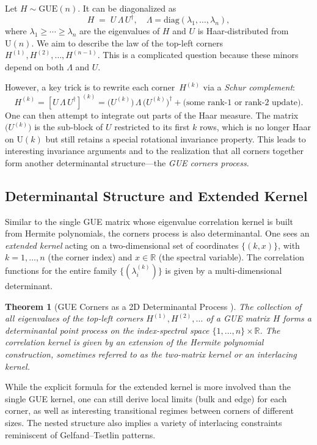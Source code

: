 \documentclass[letterpaper,11pt,oneside,reqno]{article}
\numberwithin{equation}{section}
\newtheorem{theorem}[proposition]{Theorem}
\theoremstyle{definition}
\begin{document}
Let \(H\sim \mathrm{GUE}(n)\). It can be diagonalized as
\[
	H \;=\; U \,\Lambda \,U^\dagger, \quad
	\Lambda = \mathrm{diag}(\lambda_1,\dots,\lambda_n),
\]
where \(\lambda_1\ge\cdots\ge \lambda_n\) are the eigenvalues of \(H\) and \(U\) is Haar-distributed from \(\mathrm{U}(n)\). We aim to describe the law of the top-left corners \(H^{(1)},H^{(2)},\dots,H^{(n-1)}\). This is a complicated question because these minors depend on both \(\Lambda\) and \(U\).

However, a key trick is to rewrite each corner \(\,H^{(k)}\) via a \emph{Schur complement}:
\[
	H^{(k)} 
	=\left[ U\,\Lambda\,U^\dagger \right]^{(k)}
	=\bigl(U^{(k)}\bigr)\,\Lambda\,\bigl(U^{(k)}\bigr)^\dagger
	+\text{(some rank-1 or rank-2 update)}.
\]
One can then attempt to integrate out parts of the Haar measure. The matrix \(\bigl(U^{(k)}\bigr)\) is the sub-block of \(U\) restricted to its first \(k\) rows, which is no longer Haar on \(\mathrm{U}(k)\) but still retains a special rotational invariance property. This leads to interesting invariance arguments and to the realization that all corners together form another determinantal structure---the \emph{GUE corners process}.

\subsection{Determinantal Structure and Extended Kernel}

Similar to the single GUE matrix whose eigenvalue correlation kernel is built from Hermite polynomials, the corners process is also determinantal. One sees an \emph{extended kernel} acting on a two-dimensional set of coordinates \(\{(k,x)\}\), with \(k=1,\dots,n\) (the corner index) and \(x\in \mathbb{R}\) (the spectral variable). The correlation functions for the entire family \(\{(\lambda_i^{(k)})\}\) is given by a multi-dimensional determinant. 

\begin{theorem}[GUE Corners as a 2D Determinantal Process {\cite{johansson2006eigenvalues}}]
The collection of all eigenvalues of the top-left corners \(H^{(1)},H^{(2)},\dots\) of a GUE matrix \(H\) forms a determinantal point process on the index-spectral space \(\{1,\dots,n\}\times \mathbb{R}\). The correlation kernel is given by an extension of the Hermite polynomial construction, sometimes referred to as the \emph{two-matrix kernel} or an \emph{interlacing kernel}.
\end{theorem}

While the explicit formula for the extended kernel is more involved than the single GUE kernel, one can still derive local limits (bulk and edge) for each corner, as well as interesting transitional regimes between corners of different sizes. The nested structure also implies a variety of interlacing constraints reminiscent of Gelfand--Tsetlin patterns.
\end{document}
